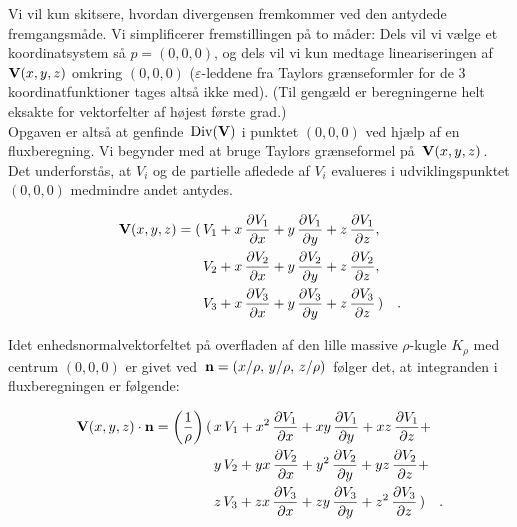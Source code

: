 \begin{bevis}
Vi vil kun skitsere, hvordan divergensen fremkommer ved den
antydede fremgangsmåde. Vi simplificerer
fremstillingen på to måder: Dels vil vi vælge et
koordinatsystem så $p = (0,0,0)$, og dels vil vi
kun medtage lineariseringen af ${\bf{V}}(x,y,z)$
omkring $(0,0,0)$ ($\varepsilon$-leddene fra
Taylors grænseformler for de 3 koordinatfunktioner
tages altså ikke med). (Til gengæld er
beregningerne helt eksakte for vektorfelter af
højest første grad.)\\

Opgaven er altså at genfinde $\,\operatorname{Div}({\bf{V}})$ i
punktet $(0,0,0)$ ved hjælp af en fluxberegning.
Vi be\-gyn\-der med at bruge Taylors grænseformel på
$\,{\bf{V}}(x,y,z)\,$. Det underforstås, at
$V_{i}$ og de partielle afledede af $V_{i}$
evalueres i udviklingspunktet $(0,0,0)$ medmindre
andet antydes.


\begin{equation}
\begin{aligned}
{\bf{V}}(x,y,z) = (\, & V_{1} + x\,\frac{\partial V_{1}}{\partial x}
 + y\,\frac{\partial V_{1}}{\partial y}
 + z\,\frac{\partial V_{1}}{\partial z},\\
& V_{2} + x\,\frac{\partial V_{2}}{\partial x}
 + y\,\frac{\partial V_{2}}{\partial y}
 + z\,\frac{\partial V_{2}}{\partial z},\\
 & V_{3} + x\,\frac{\partial V_{3}}{\partial x}
 + y\,\frac{\partial V_{3}}{\partial y}
 + z\,\frac{\partial V_{3}}{\partial z} \,) \quad .
\end{aligned}
\end{equation}

Idet enhedsnormalvektorfeltet på overfladen af
den lille massive $\rho$-kugle $K_{\rho}$ med
centrum $(0,0,0)$ er givet ved $\,{\bf{n}} =
(x/\rho,\, y/\rho,\, z/\rho)\,$ følger det, at
integranden i fluxberegningen er følgende:

\begin{equation} \label{eqVolFlux}
\begin{aligned}
{\bf{V}}(x,y,z)\cdot {\bf{n}} = \left( \frac{1}{\rho}\right)(\, &
x\,V_{1} + x^{2}\,\frac{\partial V_{1}}{\partial x}
 + xy\,\frac{\partial V_{1}}{\partial y}
 + xz\,\frac{\partial V_{1}}{\partial z} + \\
& y\,V_{2} + yx\,\frac{\partial V_{2}}{\partial x}
 + y^{2}\,\frac{\partial V_{2}}{\partial y}
 + yz\,\frac{\partial V_{2}}{\partial z} + \\
 & z\,V_{3} + zx\,\frac{\partial V_{3}}{\partial x}
 + zy\,\frac{\partial V_{3}}{\partial y}
 + z^{2}\,\frac{\partial V_{3}}{\partial z}\, ) \quad .
\end{aligned}
\end{equation}


\end{bevis}
